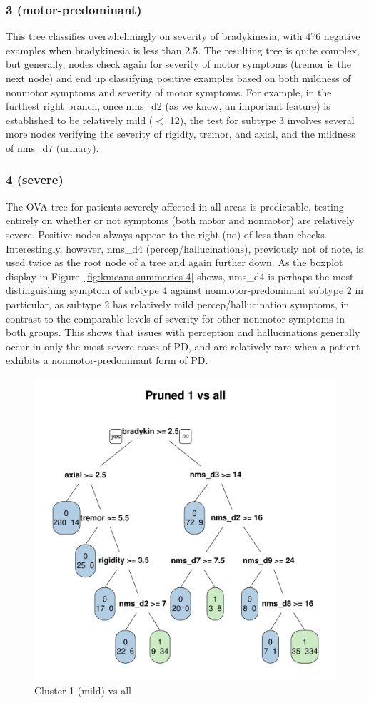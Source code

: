 \documentclass[10pt]{article}
\begin{document}

\subsubsection{3 (motor-predominant)}

This tree classifies overwhelmingly on severity of bradykinesia, with 476
negative examples when bradykinesia is less than 2.5. The resulting tree is
quite complex, but generally, nodes check again for severity of motor
symptoms (tremor is the next node) and end up classifying positive examples
based on both mildness of nonmotor symptoms and severity of motor symptoms. For
example, in the furthest right branch, once nms\_d2 (as we know, an important
feature) is established to be relatively mild ($<$ 12), the test for subtype 3
involves several more nodes verifying the severity of rigidty, tremor, and
axial, and the mildness of nms\_d7 (urinary).

\subsubsection{4 (severe)}

The OVA tree for patients severely affected in all areas is predictable, testing
entirely on whether or not symptoms (both motor and nonmotor) are relatively
severe. Positive nodes always appear to the right (no) of less-than checks.
Interestingly, however, nms\_d4 (percep/hallucinations), previously not of note, is used twice as the
root node of a tree and again further down. As the boxplot display in
Figure~\ref{fig:kmeans-summaries-4} shows, nms\_d4 is perhaps the most
distinguishing symptom of subtype 4 against nonmotor-predominant
subtype 2 in particular, as subtype 2 has relatively mild percep/hallucination
symptoms, in contrast to the comparable levels of severity for other nonmotor
symptoms in both groups. This shows that issues with perception and
hallucinations generally occur in only the most severe cases of PD, and are
relatively rare when a patient exhibits a nonmotor-predominant form of PD.

\begin{figure}[h]
  \centering
  \includegraphics[width=0.6\linewidth]{dtree-1va-pruned.pdf}
  \caption{Cluster 1 (mild) vs all}
  \label{fig:1va}
\end{figure}
\end{document}
